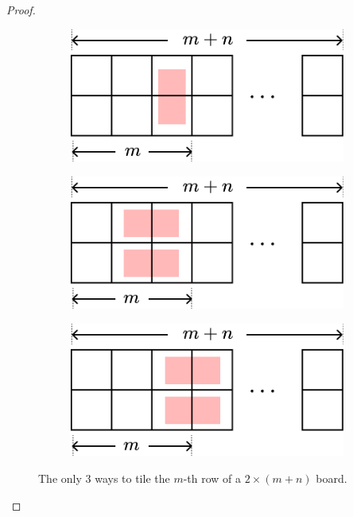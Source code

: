 \begin{proof}
\begin{figure}[H]
	\centering
	\begin{subfigure}[b]{0.3\textwidth}
		\centering
		\includegraphics[scale=0.6]{Images/Figure6_1.png}
		\caption{}
	\end{subfigure}
	\hfill
	\begin{subfigure}[b]{0.3\textwidth}
		\centering
		\includegraphics[scale=0.6]{Images/Figure6_2.png}
		\caption{}
	\end{subfigure}
	\hfill
	\begin{subfigure}[b]{0.3\textwidth}
		\centering
		\includegraphics[scale=0.6]{Images/Figure6_3.png}
		\caption{}
	\end{subfigure}
	\caption{The only $3$ ways to tile the $m$-th row of a $2\times \left( m+n \right)$ board.}
	\label{f:1.6}
\end{figure}


\end{proof}
